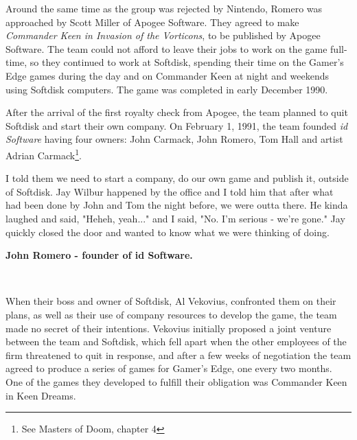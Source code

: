 \documentclass[book.tex]{subfiles}
\begin{document}
Around the same time as the group was rejected by Nintendo, Romero was approached by Scott Miller of Apogee Software. They agreed to make \textit{Commander Keen in Invasion of the Vorticons}, to be published by Apogee Software. The team could not afford to leave their jobs to work on the game full-time, so they continued to work at Softdisk, spending their time on the Gamer's Edge games during the day and on Commander Keen at night and weekends using Softdisk computers. The game was completed in early December 1990.\\

\par
After the arrival of the first royalty check from Apogee, the team planned to quit Softdisk and start their own company. On February 1, 1991, the team founded \textit{id Software} having four owners: John Carmack, John Romero, Tom Hall and artist Adrian Carmack\footnote{See Masters of Doom, chapter 4}. \\

\par
\begin{fancyquotes}
I told them we need to start a company, do our own game and publish it, outside of Softdisk. Jay Wilbur happened by the office and I told him that after what had been done by John and Tom the night before, we were outta there. He kinda laughed and said, "Heheh, yeah..." and I said, "No. I'm serious - we're gone." Jay quickly closed the door and wanted to know what we were thinking of doing.\\
\par
\textbf{John Romero - founder of id Software.}
\end{fancyquotes}\\
\par


When their boss and owner of Softdisk, Al Vekovius, confronted them on their plans, as well as their use of company resources to develop the game, the team made no secret of their intentions. Vekovius initially proposed a joint venture between the team and Softdisk, which fell apart when the other employees of the firm threatened to quit in response, and after a few weeks of negotiation the team agreed to produce a series of games for Gamer's Edge, one every two months. One of the games they developed to fulfill their obligation was Commander Keen in Keen Dreams.\\
\par
\end{document}
